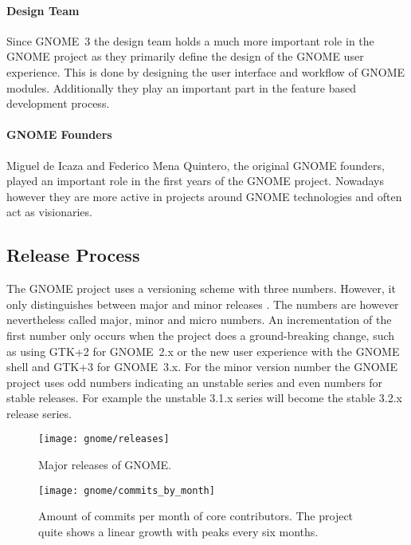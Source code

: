 \paragraph{Design Team}

Since GNOME~3 the design team holds a much more important role in the GNOME
project as they primarily define the design of the GNOME user experience. This
is done by designing the user interface and workflow of GNOME modules.
Additionally they play an important part in the feature based development
process.

\paragraph{GNOME Founders}

Miguel de Icaza and Federico Mena Quintero, the original GNOME founders, played
an important role in the first years of the GNOME project. Nowadays however
they are more active in projects around GNOME technologies and often act as
visionaries.


\subsection{Release Process} %

The GNOME project uses a versioning scheme with three numbers. However, it only
distinguishes between major and minor releases
\cite{GNOMEDevelopmentSchedule,GNOMESchedule}. The numbers are however
nevertheless called major, minor and micro numbers. An incrementation of the
first number only occurs when the project does a ground-breaking change, such
as using \ac{GTK}+2 for GNOME~2.x or the new user experience with the GNOME
shell and \ac{GTK}+3 for GNOME~3.x. For the minor version number the GNOME
project uses odd numbers indicating an unstable series and even numbers for
stable releases. For example the unstable 3.1.x series will become the stable
3.2.x release series.

\vfill
\begin{figure}[hbtp]
  \centering
  \texttt{[image: gnome/releases]}
  \caption[Major Releases of GNOME]{Major releases of GNOME.}
\end{figure}

\begin{figure}[htbp]
  \centering
  \texttt{[image: gnome/commits\_by\_month]}
  \caption[Commits by Month, GNOME]
  {Amount of commits per month of core contributors. The project quite shows a
    linear growth with peaks every six months.}
  \label{fig:gnome:cbm}
\end{figure}

